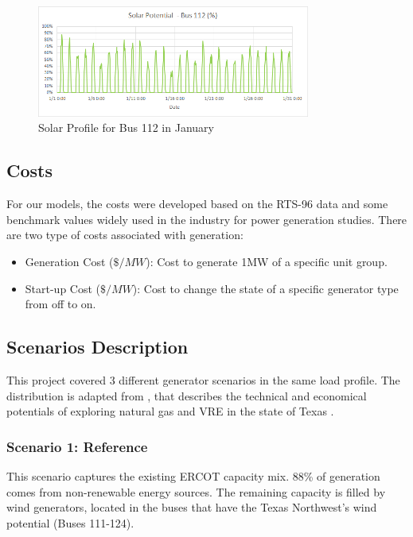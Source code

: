 \documentclass[12pt,LUDisStyle,twosided]{book}
\begin{document}
\begin{figure}[H] 
	\begin{center}
		\includegraphics[width=0.8\textwidth,keepaspectratio]{solarPotentialBus112.png}
	  	\caption{Solar Profile for Bus 112 in January }
     	\label{fig:solarProfileBus112January}
	\end{center}
\end{figure}


\subsection{Costs}

For our models, the costs were developed based on the RTS-96 data and some benchmark values widely used in the industry for power generation studies. There are two type of costs associated with generation:

\begin{itemize}
\item Generation Cost ($\$/MW$): Cost to generate 1MW of a specific unit group.
\item Start-up Cost ($\$/MW$): Cost to change the state of a specific generator type from off to on.
\end{itemize}

\subsection{Scenarios Description} \label{section:ScenarioDesc}

This project covered 3 different generator scenarios in the same load profile. The distribution is adapted from \citeauthor{shavel} \cite{shavel}, that describes the technical and economical potentials of exploring natural gas and VRE in the state of Texas \cite{shavel}. 

\subsubsection{Scenario 1: Reference}

This scenario captures the existing ERCOT capacity mix. 88\% of generation comes from non-renewable energy sources. The remaining capacity is filled by wind generators, located in the buses that have the Texas Northwest's wind potential (Buses 111-124).
\end{document}
